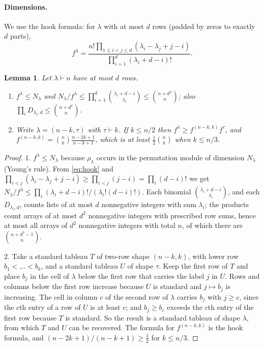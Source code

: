 \documentclass[11pt,a4paper]{article}
\newtheorem{lemma}[theorem]{Lemma}
\theoremstyle{remark}
\begin{document}
\paragraph{Dimensions.} We use the hook formula: for $\lambda$ with at most $d$ rows (padded by zeros to exactly $d$ parts),
\begin{equation}\label{eq:hook}
 f^\lambda=\frac{n!\prod_{1\le i<j\le d}(\lambda_i-\lambda_j+j-i)}{\prod_{i=1}^d(\lambda_i+d-i)!}.
\end{equation}
\begin{lemma}\label{lem:dims}
Let $\lambda\vdash n$ have at most $d$ rows.
\begin{enumerate}
\item $f^\lambda\le N_\lambda$ and $N_\lambda/f^\lambda\le\prod_{i=1}^d\binom{\lambda_i+d-i}{\lambda_i}\le\binom{n+d^2}{n}$; also $\prod_iD_{\lambda_i,d}\le\binom{n+d^2}{n}$.
\item Write $\lambda=(n-k,\tau)$ with $\tau\vdash k$. If $k\le n/2$ then $f^\lambda\ge f^{(n-k,k)}f^\tau$, and $f^{(n-k,k)}=\binom nk\frac{n-2k+1}{n-k+1}$, which is at least $\frac12\binom nk$ when $k\le n/3$.
\end{enumerate}
\end{lemma}
\begin{proof}
1. $f^\lambda\le N_\lambda$ because $\rho_\lambda$ occurs in the permutation module of dimension $N_\lambda$ (Young's rule). From \eqref{eq:hook} and $\prod_{i<j}(\lambda_i-\lambda_j+j-i)\ge\prod_{i<j}(j-i)=\prod_i(d-i)!$ we get $N_\lambda/f^\lambda\le\prod_i(\lambda_i+d-i)!/(\lambda_i!(d-i)!)$. Each binomial $\binom{\lambda_i+d-i}{\lambda_i}$, and each $D_{\lambda_i,d}$, counts lists of at most $d$ nonnegative integers with sum $\lambda_i$; the products count arrays of at most $d^2$ nonnegative integers with prescribed row sums, hence at most all arrays of $d^2$ nonnegative integers with total $n$, of which there are $\binom{n+d^2-1}{n}$.

2. Take a standard tableau $T$ of two-row shape $(n-k,k)$, with lower row $b_1<\dots<b_k$, and a standard tableau $U$ of shape $\tau$. Keep the first row of $T$ and place $b_j$ in the cell of $\lambda$ below the first row that carries the label $j$ in $U$. Rows and columns below the first row increase because $U$ is standard and $j\mapsto b_j$ is increasing. The cell in column $c$ of the second row of $\lambda$ carries $b_j$ with $j\ge c$, since the $c$th entry of a row of $U$ is at least $c$; and $b_j\ge b_c$ exceeds the $c$th entry of the first row because $T$ is standard. So the result is a standard tableau of shape $\lambda$, from which $T$ and $U$ can be recovered. The formula for $f^{(n-k,k)}$ is the hook formula, and $(n-2k+1)/(n-k+1)\ge\frac12$ for $k\le n/3$.
\end{proof}
\end{document}

